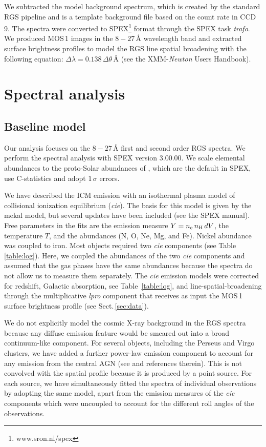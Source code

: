 \documentclass[useAMS,usenatbib]{mn2e}
\begin{document}
We subtracted the model background spectrum, which is created by the standard RGS pipeline 
and is a template background file based on the count rate in CCD\,9.
The spectra were converted to SPEX\footnote{www.sron.nl/spex} format through the SPEX task \textit{trafo}.
We produced MOS\,1 images in the $8-27$\,{\AA} wavelength band and extracted
surface brightness profiles to model the RGS line spatial broadening
with the following equation: $\Delta\lambda = 0.138 \, \Delta\theta \, {\mbox{\AA}}$
(see the XMM-\textit{Newton} Users Handbook).

\section{Spectral analysis}
\label{sec:spectral_modeling}

\subsection{Baseline model}
\label{sec:baseline_model}

Our analysis focuses on the $8-27$\,{\AA} first and second order RGS spectra.
We perform the spectral analysis with SPEX
version 3.00.00. We scale elemental abundances to the proto-Solar abundances 
of \citet{Lodders09}, which are the default in SPEX, 
use C-statistics and adopt $1\,\sigma$ errors.

We have described the ICM emission with an isothermal plasma model 
of collisional ionization equilibrium (\textit{cie}). 
The basis for this model is given by the mekal model, 
but several updates have been included (see the SPEX manual).
Free parameters in the fits are the emission measure $Y=n_{\rm e}\,n_{\rm H}\,dV$, 
the temperature $T$, and the abundances (N, O, Ne, Mg, and Fe).
Nickel abundance was coupled to iron.
Most objects required two \textit{cie} components
(see Table\,\ref{table:log}). 
Here, we coupled the abundances of the two \textit{cie} components
and assumed that the gas phases have the same abundances 
because the spectra do not allow us to measure them separately.
The \textit{cie} emission models were corrected for redshift, 
Galactic absorption, see Table~\ref{table:log},
and line-spatial-broadening through 
the multiplicative \textit{lpro} component
that receives as input the MOS\,1 surface brightness profile
(see Sect.\,\ref{sec:data}).

We do not explicitly model the cosmic X-ray background in the RGS spectra 
because any diffuse emission feature would be smeared out into a broad continuum-like component. 
For several objects, including the Perseus and Virgo clusters, 
we have added a further power-law emission component
to account for any emission from the central AGN
{(see \citealt{Russell2013} and references therein)}.
This is not convolved with the spatial profile because 
it is produced by a point source.
For each source, we have simultaneously fitted the spectra of individual observations
by adopting the same model, apart from the emission measures of the \textit{cie} components
which were uncoupled to account for the different roll angles of the observations.
\end{document}

